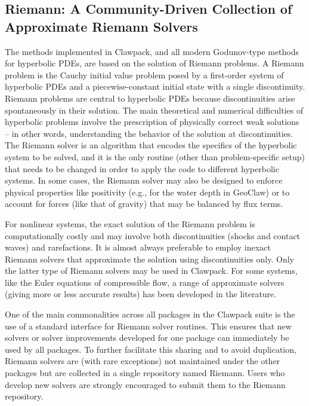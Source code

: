 %
%
%

\subsection{Riemann: A Community-Driven Collection of Approximate Riemann Solvers}
The methods implemented in Clawpack, and all modern Godunov-type methods for
hyperbolic PDEs, are based on the solution of Riemann problems.  A Riemann
problem is the Cauchy initial value problem posed by a first-order system of
hyperbolic PDEs and a piecewise-constant initial state with a single
discontinuity.  Riemann problems are central to hyperbolic PDEs because
discontinuities arise spontaneously in their solution.  The main theoretical
and numerical difficulties of hyperbolic problems involve the prescription of
physically correct weak solutions -- in other words, understanding the behavior
of the solution at discontinuities.  The Riemann solver is an algorithm that
encodes the specifics of the hyperbolic system to be solved, and it is the only
routine (other than problem-specific setup) that needs to be changed in order
to apply the code to different hyperbolic systems.  In some cases, the Riemann
solver may also be designed to enforce physical properties like positivity
(e.g., for the water depth in GeoClaw) or to account for forces (like that
of gravity) that may be balanced by flux terms.

For nonlinear systems, the exact solution of the Riemann problem is computationally
costly and may involve both discontinuities (shocks and contact waves) and
rarefactions.  It is almost always preferable to employ inexact Riemann solvers
that approximate the solution using discontinuities only.  Only the latter type
of Riemann solvers may be used in Clawpack.  For some systems, like the Euler
equations of compressible flow, a range of approximate solvers (giving 
more or less accurate results) has been developed in the literature.

One of the main commonalities across all packages in the Clawpack suite is the
use of a standard interface for Riemann solver routines.  This ensures that new
solvers or solver improvements developed for one package can immediately
be used by all packages.  To further facilitate this sharing and to avoid 
duplication, Riemann solvers are (with rare exceptions) not maintained under
the other packages but are collected in a single repository named Riemann.
Users who develop new solvers are strongly encouraged to submit them to the
Riemann repository.

